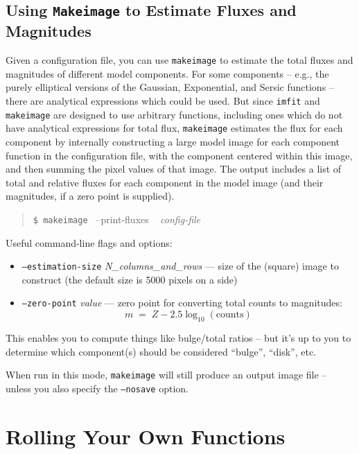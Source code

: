 \documentclass[10pt,a4paper,article]{memoir}
\newcommand{\imfit}{\texttt{imfit}}
\newcommand{\makeimage}{\texttt{makeimage}}
\newcommand{\Makeimage}{\texttt{Makeimage}}
\begin{document}
\section{Using \Makeimage{} to Estimate Fluxes and Magnitudes}

Given a configuration file, you can use \makeimage{} to estimate the total
fluxes and magnitudes of different model components. For some components --
e.g., the purely elliptical versions of the Gaussian, Exponential, and Sersic
functions -- there are analytical expressions which could be used. But since
\imfit{} and \makeimage{} are designed to use arbitrary functions, including
ones which do not have analytical expressions for total flux, \makeimage{}
estimates the flux for each component by internally constructing a large model
image for each component function in the configuration file, with the
component centered within this image, and then summing the pixel values of that image. The
output includes a list of total and relative fluxes for each component in the
model image (and their magnitudes, if a zero point is supplied).


\begin{quote}
  \texttt{\$ \makeimage{} }  --print-fluxes ~ \textit{config-file}
\end{quote}

Useful command-line flags and options:
\begin{itemize}

\item \texttt{--estimation-size} \textit{N\_columns\_and\_rows} --- size of the
(square) image to construct (the default size is 5000 pixels on a side)

\item \texttt{--zero-point} \textit{value} --- zero point for converting total counts
to magnitudes:
\begin{equation}
m \; = \; Z - 2.5 \log_{10}( {\mathrm{counts}} )
\end{equation}

\end{itemize}

This enables you to compute things like bulge/total ratios -- but it's up to you
to determine which component(s) should be considered ``bulge'', ``disk'', etc.

When run in this mode, \makeimage{} will still produce an output image file --
unless you also specify the \texttt{--nosave} option.




\chapter{Rolling Your Own Functions}
\end{document}
